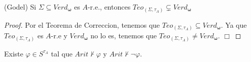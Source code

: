   \begin{theorem}
    (Godel) Si \(\Sigma \subseteq Verd_{\mathbf{\omega }}\) es \(A\)-r.e., entonces \( Teo_{(\Sigma ,\tau _{A})}\subsetneq Verd_{\mathbf{\omega }}\)
  \end{theorem}
  \begin{proof}
    Por el Teorema de Correccion, tenemos que \(Teo_{(\Sigma ,\tau _{A})}\subseteq Verd_{\mathbf{\omega }}\). Ya que \(Teo_{(\Sigma ,\tau _{A})}\) es \(A\)-r.e y \(Verd_{\mathbf{\omega }}\) no lo es, tenemos que \(Teo_{(\Sigma ,\tau _{A})}\neq Verd_{\mathbf{\omega }}\). \(\Box\)
  \end{proof}

  \begin{corollary}
    Existe \(\varphi \in S^{\tau _{A}}\) tal que \(Arit\nvdash \varphi \) y \( Arit\nvdash \lnot \varphi \).
  \end{corollary}
